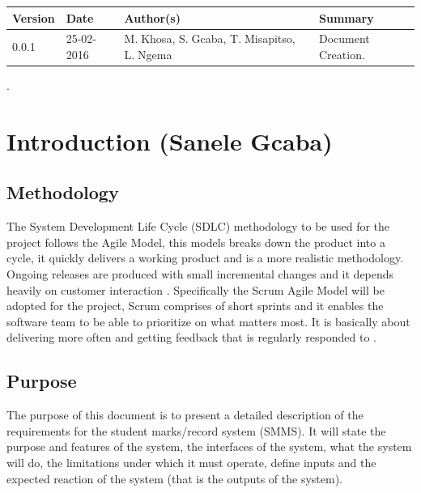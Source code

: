 \documentclass[10pt,onecolumn]{lab}
\begin{document}
\begin{center}
    \begin{tabular}{ | p{2cm} | p{3cm} | p{5cm} | p{5cm} |}
    \hline
    \textbf{Version}& \textbf{Date}& \textbf{Author(s)} & \textbf{Summary} \\ \hline
    0.0.1 & 25-02-2016 & M.$\;$Khosa, S.$\;$Gcaba, T.$\;$Misapitso, L.$\;$Ngema& Document Creation. \\ \hline

    \end{tabular}
\end{center}

\newpage


%
\pagestyle{plain}.
\section{Introduction (Sanele Gcaba)}

\subsection{Methodology}

The System Development Life Cycle (SDLC) methodology to be used for the project follows the Agile Model, this models breaks down the product into a cycle, it quickly delivers a working product and is a more realistic methodology. Ongoing releases are produced with small incremental changes and it depends heavily on customer interaction \cite{ref7}. Specifically the Scrum Agile Model will be adopted for the project, Scrum comprises of short sprints and it enables the software team to be able to prioritize on what matters most. It is basically about delivering more often and getting feedback that is regularly responded to \cite{ref8}.           

\subsection{Purpose}

The purpose of this document is to present a detailed description of the requirements for the student marks/record system (SMMS). It will state the purpose and features of the system, the interfaces of the system, what the system will do, the limitations under which it must operate, define inputs and the expected reaction of the system (that is the outputs of the system). 
\end{document}
